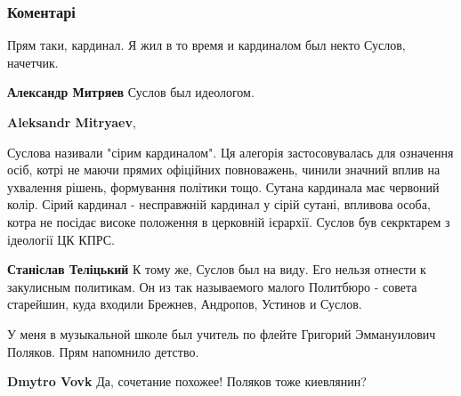  
 
 
 
 
\subsubsection{Коментарі}
\label{sec:12_10_2021.fb.fb_group.story_kiev_ua.1.kievljanin_brezhnev_okonchanie.cmt}

\begin{itemize} %
Прям таки, кардинал. Я жил в то время и кардиналом был некто Суслов, начетчик.

\begin{itemize} %
\textbf{Александр Митряев} Суслов был идеологом.

\textbf{Aleksandr Mitryaev}, 

Суслова називали "сірим кардиналом". Ця алегорія застосовувалась для означення
осіб, котрі не маючи прямих офіційних повноважень, чинили значний вплив на
ухвалення рішень, формування політики тощо. Сутана кардинала має червоний
колір. Сірий кардинал - несправжній кардинал у сірій сутані, впливова особа,
котра не посідає високе положення в церковній ієрархії. Суслов був секрктарем з
ідеології ЦК КПРС.

\begin{itemize} %
\textbf{Станіслав Теліцький} К тому же, Суслов был на виду. Его нельзя отнести к закулисным политикам. Он из так называемого малого Политбюро - совета старейшин, куда входили Брежнев, Андропов, Устинов и Суслов.
\end{itemize} %

\end{itemize} %


У меня в музыкальной школе был учитель по флейте Григорий Эммануилович Поляков.
Прям напомнило детство.

\begin{itemize} %
\textbf{Dmytro Vovk} Да, сочетание похожее! Поляков тоже киевлянин?


\end{itemize}
\end{itemize}
